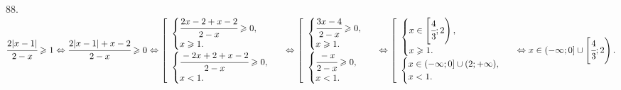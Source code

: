 88. $\cfrac{2|x-1|}{2-x}\geqslant1 \Leftrightarrow \cfrac{2|x-1|+x-2}{2-x}\geqslant0\Leftrightarrow
\left[\begin{array}{l}\begin{cases} \cfrac{2x-2+x-2}{2-x}\geqslant0,\\ x\geqslant 1.\end{cases}\\ \begin{cases}\cfrac{-2x+2+x-2}{2-x}\geqslant0,\\ x<1.           \end{cases}\end{array}\right.\Leftrightarrow
\left[\begin{array}{l}\begin{cases} \cfrac{3x-4}{2-x}\geqslant0,\\ x\geqslant 1.\end{cases}\\ \begin{cases}\cfrac{-x}{2-x}\geqslant0,\\ x<1.           \end{cases}\end{array}\right.\Leftrightarrow
\left[\begin{array}{l}\begin{cases} x\in\left[\cfrac{4}{3};2\right),\\ x\geqslant 1.\end{cases}\\ \begin{cases}x\in(-\infty;0]\cup(2;+\infty),\\ x<1.           \end{cases}\end{array}\right.\Leftrightarrow x\in(-\infty;0]\cup\left[\cfrac{4}{3};2\right).$\\
